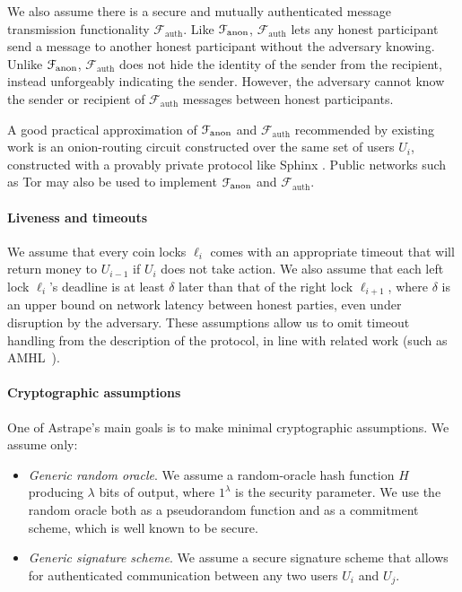 \documentclass[USenglish,oneside,twocolumn]{article}
\begin{document}
\newcommand{\Fauth}{\mathcal{F}_\mathrm{auth}}


We also assume there is a secure and mutually authenticated message transmission functionality $\Fauth$. Like $\mathcal{F}_\mathrm{anon}$, $\Fauth$ lets any honest participant send a message to another honest participant without the adversary knowing. Unlike $\mathcal{F}_\mathrm{anon}$, $\Fauth$ does not hide the identity of the sender from the recipient, instead unforgeably indicating the sender. However, the adversary cannot know the sender or recipient of $\Fauth$ messages between honest participants.

A good practical approximation of $\mathcal{F}_\mathrm{anon}$ and $\Fauth$ recommended by existing work \cite{malavolta2017concurrency,malavolta2019anonymous} is an onion-routing circuit constructed over the same set of users $U_i$, constructed with a provably private protocol like Sphinx \cite{danezis2009sphinx}. Public networks such as Tor may also be used to implement $\mathcal{F}_\mathrm{anon}$ and $\Fauth$.

\paragraph*{Liveness and timeouts} We assume that every coin locks $\ell_i$ comes with an appropriate timeout that will return money to $U_{i-1}$ if $U_i$ does not take action. We also assume that each left lock $\ell_i$'s deadline is at least $\delta$ later than that of the right lock $\ell_{i+1}$, where $\delta$ is an upper bound on network latency between honest parties, even under disruption by the adversary. These assumptions allow us to omit timeout handling from the description of the protocol, in line with related work (such as AMHL~\cite{malavolta2019anonymous}).


\paragraph*{Cryptographic assumptions} One of Astrape's main goals is to make minimal cryptographic assumptions. We assume only:

\begin{itemize}
    \item \emph{Generic random oracle}. We assume a random-oracle hash function $H$ producing $\lambda$ bits of output, where $1^\lambda$ is the security parameter. We use the random oracle both as a pseudorandom function and as a commitment scheme, which is well known \cite{camenisch2018wonderful} to be secure.
    \item \emph{Generic signature scheme}. We assume a secure signature scheme that allows for authenticated communication between any two users $U_i$ and $U_j$.
\end{itemize}
\end{document}
